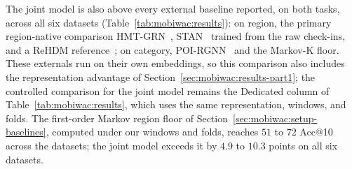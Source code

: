
The joint model is also above every external baseline reported, on both tasks,
across all six datasets (Table~\ref{tab:mobiwac:results}): on region, the primary
region-native comparison HMT-GRN~\cite{Lim2022}, STAN~\cite{luo2021stan}
trained from the raw check-ins, and a ReHDM reference~\cite{li2025rehdm}; on
category, POI-RGNN~\cite{capanema2023poirgnn} and the Markov-K floor. These externals run on their own embeddings, so this comparison
also includes the representation advantage of Section~\ref{sec:mobiwac:results-part1}; the
controlled comparison for the joint model remains the Dedicated column of
Table~\ref{tab:mobiwac:results}, which uses the same representation, windows, and
folds. The first-order Markov region floor of Section~\ref{sec:mobiwac:setup-baselines},
computed under our windows and folds, reaches $51$ to $72$ Acc@10 across the
datasets; the joint model exceeds it by $4.9$ to $10.3$ points on all six
datasets.

